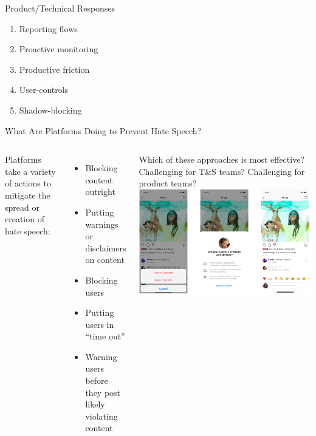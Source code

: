 \documentclass[nobackground,dvipsnames,table]{beamer}
\begin{document}
\begin{frame}{Product/Technical Responses}
    \large
    \begin{enumerate}
        \item Reporting flows
        \item Proactive monitoring
        \item Productive friction
        \item User-controls
        \item Shadow-blocking
    \end{enumerate}
\end{frame}

\begin{frame}{What Are Platforms Doing to Prevent Hate Speech?}
    \begin{columns}
            \footnotesize
            Platforms take a variety of actions to mitigate the spread or creation of hate speech:\\
            \begin{itemize}
                \item Blocking content outright
                \item Putting warnings or disclaimers on content
                \item Blocking users
                \item Putting users in “time out”
                \item Warning users before they post likely violating content
            \end{itemize}
            
            Which of these approaches is most effective? Challenging for T\&S teams? Challenging for product teams?
            \includegraphics[width=\textwidth]{shadow-blocking}
    \end{columns}
\end{frame}
\end{document}
